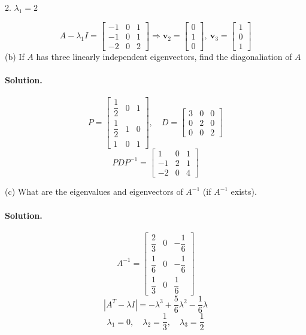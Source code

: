 2. $\lambda_1 = 2$

$$A - \lambda_1 I = \begin{bmatrix}
    -1&0&1\\-1&0&1\\-2&0&2
\end{bmatrix} \Rightarrow \mathbf{v}_2=\begin{bmatrix}
    0\\1\\0
\end{bmatrix},\ \mathbf{v}_3=\begin{bmatrix}
    1\\0\\1
\end{bmatrix}$$
\newpage
(b) If $A$ has three linearly independent eigenvectors, find the diagonaliation of $A$
\paragraph{Solution.}
$$P=\begin{bmatrix}
    \dfrac{1}{2} & 0 & 1\\[0.3cm]
    \dfrac{1}{2} & 1 & 0\\[0.3cm]
    1 & 0 & 1
\end{bmatrix},\quad D=\begin{bmatrix}
    3 & 0 & 0\\
    0 & 2 & 0\\
    0 & 0 & 2
\end{bmatrix}$$
$$PDP^{-1} = \begin{bmatrix}
    1&0&1\\
    -1&2&1\\
    -2&0&4
\end{bmatrix}$$

(c) What are the eigenvalues and eigenvectors of $A^{-1}$ (if $A^{-1}$ exists).
\paragraph{Solution.}
$$A^{-1} = \begin{bmatrix}
    \dfrac{2}{3} & 0 & -\dfrac{1}{6}\\[0.3cm]
    \dfrac{1}{6} & 0 & -\dfrac{1}{6}\\[0.3cm]
    \dfrac{1}{3} & 0 & \dfrac{1}{6}
\end{bmatrix}$$
$$|A^T-\lambda I| = -\lambda^3 + \frac{5}{6}\lambda^2-\frac{1}{6}\lambda$$
$$\lambda_1 = 0,\quad\lambda_2 = \frac{1}{3},\quad\lambda_3 = \frac{1}{2}$$

